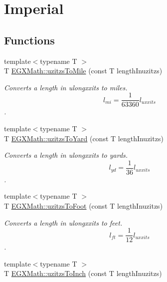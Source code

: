 \hypertarget{group___e_g_x_math-_conversions-_length_conversions-uzitzs-_imperial}{}\section{Imperial}
\label{group___e_g_x_math-_conversions-_length_conversions-uzitzs-_imperial}
\subsection*{Functions}
\begin{DoxyCompactItemize}
\item 
{\footnotesize template$<$typename T $>$ }\\T \mbox{\hyperlink{group___e_g_x_math-_conversions-_length_conversions-uzitzs-_imperial_ga3396c913e6937eee49337db8fac05ca7}{E\+G\+X\+Math\+::uzitzs\+To\+Mile}} (const T length\+Inuzitzs)
\begin{DoxyCompactList}\small\item\em Converts a length in ulongxxits to miles. \[ l_{mi}=\frac{1}{63360} l_{uxxits} \]. \end{DoxyCompactList}\item 
{\footnotesize template$<$typename T $>$ }\\T \mbox{\hyperlink{group___e_g_x_math-_conversions-_length_conversions-uzitzs-_imperial_ga3281bb64c81bc68a166a47ccc1f9a146}{E\+G\+X\+Math\+::uzitzs\+To\+Yard}} (const T length\+Inuzitzs)
\begin{DoxyCompactList}\small\item\em Converts a length in ulongxxits to yards. \[ l_{yd}= \frac{1}{36} l_{uxxits} \]. \end{DoxyCompactList}\item 
{\footnotesize template$<$typename T $>$ }\\T \mbox{\hyperlink{group___e_g_x_math-_conversions-_length_conversions-uzitzs-_imperial_gaafdc16c327535a3ea42909a5ebadac71}{E\+G\+X\+Math\+::uzitzs\+To\+Foot}} (const T length\+Inuzitzs)
\begin{DoxyCompactList}\small\item\em Converts a length in ulongxxits to feet. \[ l_{ft}= \frac{1}{12} l_{uxxits} \]. \end{DoxyCompactList}\item 
{\footnotesize template$<$typename T $>$ }\\T \mbox{\hyperlink{group___e_g_x_math-_conversions-_length_conversions-uzitzs-_imperial_gad471f5c0b894eb0f2850a19347306ed4}{E\+G\+X\+Math\+::uzitzs\+To\+Inch}} (const T length\+Inuzitzs)

\end{DoxyCompactItemize}
